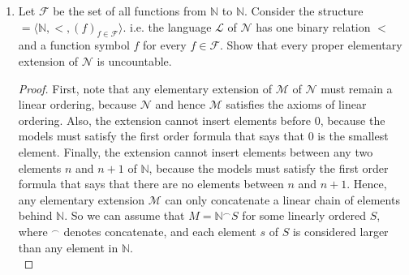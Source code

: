 \documentclass{article}
\begin{document}
\begin{enumerate}[label={\bf Q\arabic*:}]
\begin{enumerate}
\begin{proof}
        \end{proof}

      \item Let $\mathcal{F}$ be the set of all functions from $\mathbb{N}$
        to $\mathbb{N}$. Consider the structure
        $\mathcal=\langle\mathbb{N},<,(f)_{f\in\mathcal{F}}\rangle$. i.e. the
        language $\mathcal{L}$ of $\mathcal{N}$ has one binary relation $<$
        and a function symbol $f$ for every $f\in\mathcal{F}$. Show that
        every proper elementary extension of $\mathcal{N}$ is uncountable.

        \begin{proof}
          First, note that any elementary extension of $\mathcal{M}$ of
          $\mathcal{N}$ must remain a linear ordering, because
          $\mathcal{N}$ and hence $\mathcal{M}$ satisfies the axioms of
          linear ordering. Also, the extension cannot insert elements
          before $0$, because the models must satisfy the first order
          formula that says that $0$ is the smallest element. Finally, the
          extension cannot insert elements between any two elements $n$ and
          $n+1$ of $\mathbb{N}$, because the models must satisfy the first
          order formula that says that there are no elements between $n$
          and $n+1$. Hence, any elementary extension $\mathcal{M}$ can only
          concatenate a linear chain of elements behind $\mathbb{N}$. So we
          can assume that $M=\mathbb{N}^\frown S$ for some linearly ordered
          $S$, where $^\frown$ denotes concatenate, and each element $s$ of
          $S$ is considered larger than any element in $\mathbb{N}$. \\


\end{proof}
\end{enumerate}
\end{enumerate}
\end{document}
